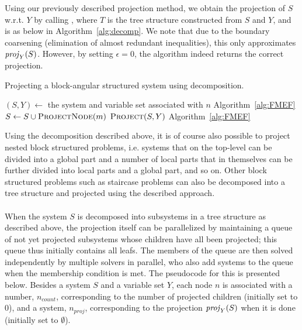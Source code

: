 Using our previously described projection method, we obtain the projection of $S$ w.r.t. $Y$ by calling , where $T$ is the tree structure constructed from $S$ and $Y$, and  is as below in Algorithm~\ref{alg:decomp}. We note that due to the boundary coarsening (elimination of almost redundant inequalities), this only approximates $\mathit{proj}_Y(S)$. However, by setting $\epsilon = 0$, the algorithm indeed returns the correct projection.

\begin{algorithm}
\caption{{Projecting a block-angular structured system using decomposition.}}
\label{alg:decomp}
\begin{algorithmic}
	\State $(S,Y)\gets$ the system and variable set associated with $n$
		\State \Return {}\Comment Algorithm~\ref{alg:FMEF}
	\Else
			\State $S \gets S\cup \Call{ProjectNode}{m}$ 
		\EndFor
		\State \Return $\Call{Project}{S, Y}$ \Comment Algorithm~\ref{alg:FMEF}
	\EndIf
\EndFunction
\end{algorithmic}
\end{algorithm}
%

\noindent Using the decomposition described above, it is of course also possible to project nested block structured problems, i.e. systems that on the top-level can be divided into a global part and a number of local parts that in themselves can be further divided into local parts and a global part, and so on.  
Other block structured problems such as staircase problems can also be decomposed into a tree structure and projected using the described approach. 
\\\\
When the system $S$ is decomposed into subsystems in a tree structure as described above, the projection itself can be parallelized by maintaining a queue of not yet projected subsystems whose children have all been projected; this queue thus initially contains all leafs. 
The members of the queue are then solved independently by multiple solvers in parallel, who also add systems to the queue when the membership condition is met.
The pseudocode for this is presented below. Besides a system $S$ and a variable set $Y$, each node $n$ is associated with a number, $n_{count}$, corresponding to the number of projected children (initially set to $0$), and a system, $n_{proj}$, corresponding to the projection $\mathit{proj}_Y(S)$ when it is done (initially set to $\emptyset$). 
\vspace{1mm}

